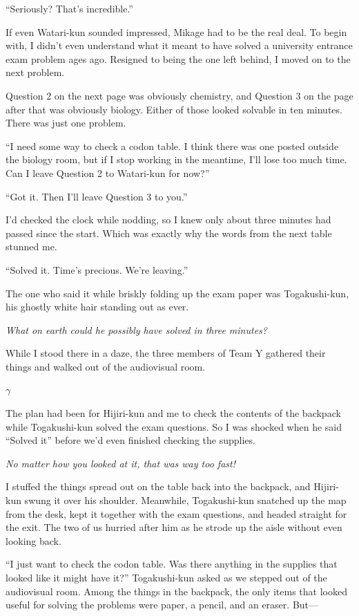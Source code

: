 \documentclass[
    a4paper,
    12pt,
    twoside,
    openany,
    UTF8,
    fontset=windows
]{ctexbook}
\begin{document}
``Seriously? That's incredible.''

If even Watari-kun sounded impressed, Mikage had to be the real deal. To begin with, I didn't even understand what it meant to have solved a university entrance exam problem ages ago. Resigned to being the one left behind, I moved on to the next problem.

Question 2 on the next page was obviously chemistry, and Question 3 on the page after that was obviously biology. Either of those looked solvable in ten minutes. There was just one problem.

``I need some way to check a codon table. I think there was one posted outside the biology room, but if I stop working in the meantime, I'll lose too much time. Can I leave Question 2 to Watari-kun for now?''

``Got it. Then I'll leave Question 3 to you.''

I'd checked the clock while nodding, so I knew only about three minutes had passed since the start. Which was exactly why the words from the next table stunned me.

``Solved it. Time's precious. We're leaving.''

The one who said it while briskly folding up the exam paper was Togakushi-kun, his ghostly white hair standing out as ever.

\textit{What on earth could he possibly have solved in three minutes?}

While I stood there in a daze, the three members of Team Y gathered their things and walked out of the audiovisual room.

$\gamma$

The plan had been for Hijiri-kun and me to check the contents of the backpack while Togakushi-kun solved the exam questions. So I was shocked when he said ``Solved it'' before we'd even finished checking the supplies.

\textit{No matter how you looked at it, that was way too fast!}

I stuffed the things spread out on the table back into the backpack, and Hijiri-kun swung it over his shoulder. Meanwhile, Togakushi-kun snatched up the map from the desk, kept it together with the exam questions, and headed straight for the exit. The two of us hurried after him as he strode up the aisle without even looking back.

``I just want to check the codon table. Was there anything in the supplies that looked like it might have it?'' Togakushi-kun asked as we stepped out of the audiovisual room. Among the things in the backpack, the only items that looked useful for solving the problems were paper, a pencil, and an eraser. But---
\end{document}
